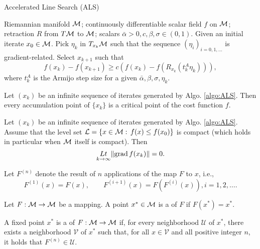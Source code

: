 \documentclass[11pt,a4paper]{article}
\begin{document}
\begin{algorithm}
    \centering
    \caption{Accelerated Line Search (ALS)}\label{algo:ALS}
    \begin{algorithmic}[1]
        \Require Riemannian manifold $\mathcal{M}$; continuously differentiable scalar field $f$ on $\mathcal{M}$; retraction $R$ from $T\mathcal{M}$ to $\mathcal{M}$; scalars $\bar{\alpha}>0,c,\beta,\sigma\in(0,1)$.
        \State Given an initial iterate $x_0\in\mathcal{M}$.
        \State Pick $\eta_k$ in $T_{x_k}\mathcal{M}$ such that the sequence $(\eta_i)_{i=0,1,\ldots}$ is gradient-related.
        \State Select $x_{k+1}$ such that 
        \begin{equation}
            f(x_k) - f(x_{k+1}) \ge c(f(x_k) - f(R_{x_k}(t^A_k\eta_k))),
        \end{equation}
        where $t^A_k$ is the Armijo step size for a given $\bar{\alpha},\beta,\sigma,\eta_k$.
        \EndFor
    \end{algorithmic}
\end{algorithm}

\begin{prop}
Let $(x_k)$ be an infinite sequence of iterates generated by Algo. \ref{algo:ALS}. Then every accumulation point of $\{x_k\}$ is a critical point of the cost function $f$.
\end{prop}

\begin{corollary}
Let $(x_k)$ be an infinite sequence of iterates generated by Algo. \ref{algo:ALS}. Assume that the level set $\mathcal{L} = \{x\in\mathcal{M}:\,f(x)\le f(x_0)\}$ is compact (which holds in particular when $\mathcal{M}$ itself is compact). Then 
\begin{equation*}
\underset{k\rightarrow\infty}{Lt} \|\text{grad}\, f(x_k)\| = 0.
\end{equation*}
\end{corollary}

Let $F^{(n)}$ denote the result of $n$ applications of the map $F$ to $x$, i.e., 
\begin{equation*}
    F^{(1)}(x) = F(x),\qquad F^{(i+1)}(x) = F(F^{(i)}(x)), i = 1,2,\ldots.
\end{equation*}

\begin{mydef}
Let $F:\mathcal{M}\rightarrow \mathcal{M}$ be a mapping. A point $x^*\in\mathcal{M}$ is a  of $F$ if $F(x^*) = x^*$.
\end{mydef}

\begin{mydef}
A fixed point $x^*$ is a  of $F:\mathcal{M}\rightarrow \mathcal{M}$ if, for every neighborhood $\mathcal{U}$ of $x^*$, there exists a neighborhood $\mathcal{V}$ of $x^*$ such that, for all $x\in\mathcal{V}$ and all positive integer $n$, it holds that $F^{(n)}\in \mathcal{U}$. 
\end{mydef}
\end{document}
